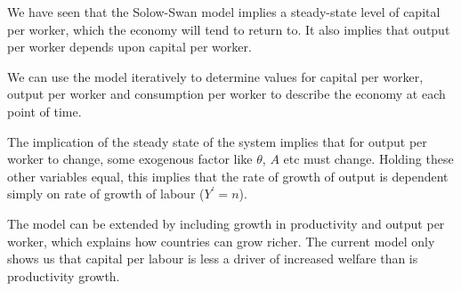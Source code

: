 \documentclass[12pt]{report}
\begin{document}
\begin{flushleft}
We have seen that the Solow-Swan model implies a steady-state level of capital
per worker, which the economy will tend to return to. It also implies that
output per worker depends upon capital per worker. \par
We can use the model iteratively to determine values for capital per worker,
output per worker and consumption per worker to describe the economy at each
point of time. \par
The implication of the steady state of the system implies that for output
per worker to change, some exogenous factor like \(\theta\), \(A\) etc must
change. Holding these other variables equal, this implies that the rate of
growth of output is dependent simply on rate of growth of labour
(\(Y^\prime = n\)). \par
The model can be extended by including growth in productivity and output per
worker, which explains how countries can grow richer. The current model only
shows us that capital per labour is less a driver of increased welfare than is
productivity growth.

\end{flushleft}
\end{document}
